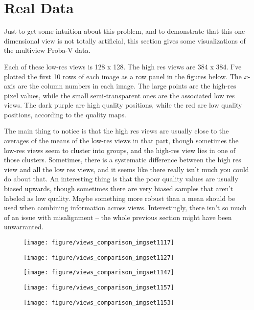 \documentclass{article}
\begin{document}
\section{Real Data}
\label{sec:real_data}

Just to get some intuition about this problem, and to demonstrate that this
one-dimensional view is not totally artificial, this section gives some
visualizations of the multiview Proba-V data.

Each of these low-res views is 128 x 128. The high res views are 384 x 384. I've
plotted the first 10 rows of each image as a row panel in the figures below. The
$x$-axis are the column numbers in each image. The large points are the high-res
pixel values, while the small semi-transparent ones are the associated low res
views. The dark purple are high quality positions, while the red are low quality
positions, according to the quality maps.

The main thing to notice is that the high res views are usually close to the
averages of the means of the low-res views in that part, though sometimes the
low-res views seem to cluster into groups, and the high-res view lies in one of
those clusters. Sometimes, there is a systematic difference between the high res
view and all the low res views, and it seems like there really isn't much you
could do about that. An interesting thing is that the poor quality values are
usually biased upwards, though sometimes there are very biased samples that
aren't labeled as low quality. Maybe something more robust than a mean should be
used when combining information across views. Interestingly, there isn't so much
of an issue with misalignment -- the whole previous section might have been
unwarranted.

\begin{figure}[ht]
  \centering
  \texttt{[image: figure/views\_comparison\_imgset1117]}
\end{figure}
\begin{figure}[ht]
  \centering
  \texttt{[image: figure/views\_comparison\_imgset1127]}
\end{figure}
\begin{figure}[ht]
  \centering
  \texttt{[image: figure/views\_comparison\_imgset1147]}
\end{figure}
\begin{figure}[ht]
  \texttt{[image: figure/views\_comparison\_imgset1157]}
\end{figure}
\begin{figure}[ht]
  \centering
  \texttt{[image: figure/views\_comparison\_imgset1153]}
\end{figure}
\end{document}
